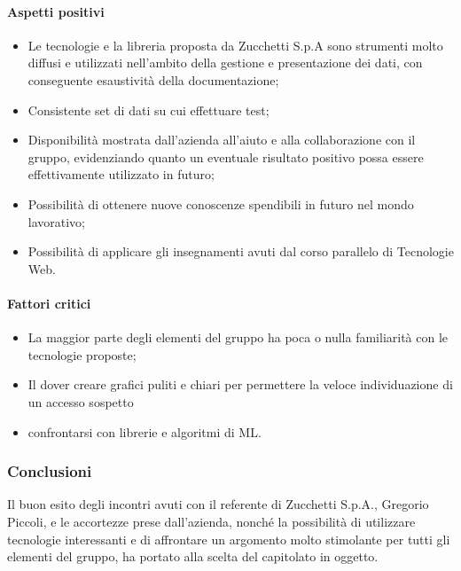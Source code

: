 \documentclass[11pt]{article}
\begin{document}
        \paragraph{Aspetti positivi}
        \begin{itemize}
            \item Le tecnologie e la libreria proposta da Zucchetti S.p.A sono strumenti molto diffusi e utilizzati nell'ambito della
            gestione e presentazione dei dati, con conseguente esaustività della documentazione;
            \item Consistente set di dati su cui effettuare test;
            \item Disponibilità mostrata dall'azienda all'aiuto e alla collaborazione con il gruppo, evidenziando quanto un eventuale
            risultato positivo possa essere effettivamente utilizzato in futuro;
            \item Possibilità di ottenere nuove conoscenze spendibili in futuro nel mondo lavorativo;
            \item Possibilità di applicare gli insegnamenti avuti dal corso parallelo di Tecnologie Web.
        \end{itemize}
        \paragraph{Fattori critici}
        \begin{itemize}
            \item La maggior parte degli elementi del gruppo ha poca o nulla familiarità con le tecnologie proposte;
            \item Il dover creare grafici puliti e chiari per permettere la veloce individuazione di un accesso sospetto
            \item confrontarsi con librerie e algoritmi di ML.
        \end{itemize}
    
    \subsubsection{Conclusioni}
    Il buon esito degli incontri avuti con il referente di Zucchetti S.p.A., Gregorio Piccoli, e le accortezze prese dall'azienda,
    nonché la possibilità di utilizzare tecnologie interessanti e di affrontare un argomento molto stimolante per tutti gli elementi del
    gruppo, ha portato alla scelta del capitolato in oggetto.
    
\end{document}
